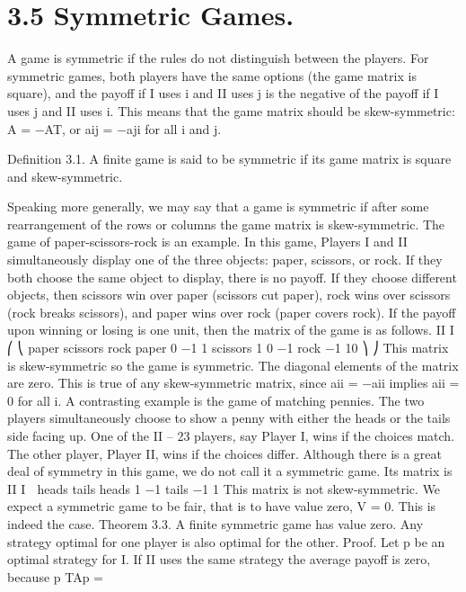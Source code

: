 \documentclass[]{report}
\begin{document}
\section{3.5 Symmetric Games.} A game is symmetric if the rules do not distinguish between
the players. For symmetric games, both players have the same options (the game matrix
is square), and the payoff if I uses i and II uses j is the negative of the payoff if I uses j
and II uses i. This means that the game matrix should be skew-symmetric: A = −AT,
or aij = −aji for all i and j.
\begin{framed}
Definition 3.1. A finite game is said to be symmetric if its game matrix is square and
skew-symmetric.
\end{framed}
Speaking more generally, we may say that a game is symmetric if after some rearrangement
of the rows or columns the game matrix is skew-symmetric.
The game of paper-scissors-rock is an example. In this game, Players I and II simultaneously
display one of the three objects: paper, scissors, or rock. If they both choose the
same object to display, there is no payoff. If they choose different objects, then scissors win
over paper (scissors cut paper), rock wins over scissors (rock breaks scissors), and paper
wins over rock (paper covers rock). If the payoff upon winning or losing is one unit, then
the matrix of the game is as follows.
II
I
⎛
⎝
paper scissors rock
paper 0 −1 1
scissors 1 0 −1
rock −1 10
⎞
⎠
This matrix is skew-symmetric so the game is symmetric. The diagonal elements of
the matrix are zero. This is true of any skew-symmetric matrix, since aii = −aii implies
aii = 0 for all i.
A contrasting example is the game of matching pennies. The two players simultaneously
choose to show a penny with either the heads or the tails side facing up. One of the
II – 23
players, say Player I, wins if the choices match. The other player, Player II, wins if the
choices differ. Although there is a great deal of symmetry in this game, we do not call it
a symmetric game. Its matrix is
II
I

heads tails
heads 1 −1
tails −1 1
This matrix is not skew-symmetric.
We expect a symmetric game to be fair, that is to have value zero, V = 0. This is
indeed the case.
Theorem 3.3. A finite symmetric game has value zero. Any strategy optimal for one
player is also optimal for the other.
Proof. Let p be an optimal strategy for I. If II uses the same strategy the average payoff
is zero, because
p
TAp = 
\end{document}

